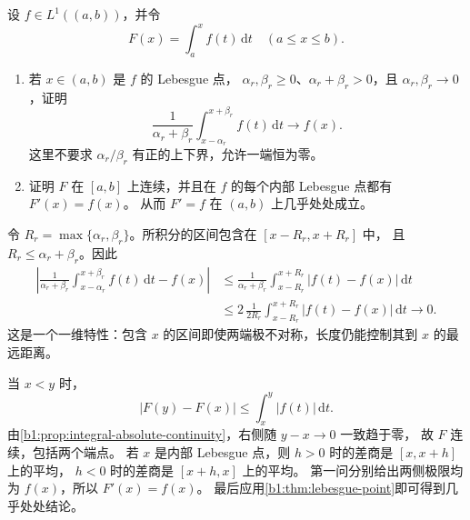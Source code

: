 \begin{exercise}\label{b1:ex:14-one-sided-primitive}
设 \(f\in L^1((a,b))\)，并令
\[
 F(x)=\int_a^x f(t)\,\mathrm dt\quad(a\leq x\leq b).
\]
\begin{enumerate}
\item\label{b1:item:14-asymmetric-average}
若 \(x\in(a,b)\) 是 \(f\) 的 Lebesgue 点，
\(\alpha_r,\beta_r\geq0\)、\(\alpha_r+\beta_r>0\)，且 \(\alpha_r,\beta_r\to0\)，证明
\[
 \frac1{\alpha_r+\beta_r}
 \int_{x-\alpha_r}^{x+\beta_r}f(t)\,\mathrm dt\longrightarrow f(x).
\]
这里不要求 \(\alpha_r/\beta_r\) 有正的上下界，允许一端恒为零。
\item\label{b1:item:14-primitive-derivative}
证明 \(F\) 在 \([a,b]\) 上连续，并且在 \(f\) 的每个内部 Lebesgue 点都有 \(F'(x)=f(x)\)。
从而 \(F'=f\) 在 \((a,b)\) 上几乎处处成立。
\end{enumerate}
\end{exercise}
\begin{solution}
令 \(R_r=\max\{\alpha_r,\beta_r\}\)。所积分的区间包含在 \([x-R_r,x+R_r]\) 中，
且 \(R_r\leq\alpha_r+\beta_r\)。因此
\[
 \begin{aligned}
 \left|\frac1{\alpha_r+\beta_r}
       \int_{x-\alpha_r}^{x+\beta_r}f(t)\,\mathrm dt-f(x)\right|
 &\leq\frac1{\alpha_r+\beta_r}
       \int_{x-R_r}^{x+R_r}|f(t)-f(x)|\,\mathrm dt\\
 &\leq2\,\frac1{2R_r}
       \int_{x-R_r}^{x+R_r}|f(t)-f(x)|\,\mathrm dt
 \longrightarrow0.
 \end{aligned}
\]
这是一个一维特性：包含 \(x\) 的区间即使两端极不对称，长度仍能控制其到 \(x\) 的最远距离。

当 \(x<y\) 时，
\[
 |F(y)-F(x)|\leq\int_x^y|f(t)|\,\mathrm dt.
\]
由\cref{b1:prop:integral-absolute-continuity}，右侧随 \(y-x\to0\) 一致趋于零，
故 \(F\) 连续，包括两个端点。
若 \(x\) 是内部 Lebesgue 点，则 \(h>0\) 时的差商是 \([x,x+h]\) 上的平均，
\(h<0\) 时的差商是 \([x+h,x]\) 上的平均。
第一问分别给出两侧极限均为 \(f(x)\)，所以 \(F'(x)=f(x)\)。
最后应用\cref{b1:thm:lebesgue-point}即可得到几乎处处结论。
\end{solution}

